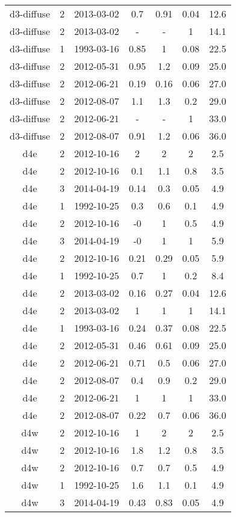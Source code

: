\begin{table*}[htp]
\begin{tabular}{ccccccc}
d3-diffuse & 2 & 2013-03-02 & 0.7 & 0.91 & 0.04 & 12.6 \\
d3-diffuse & 2 & 2013-03-02 & - & - & 1 & 14.1 \\
d3-diffuse & 1 & 1993-03-16 & 0.85 & 1 & 0.08 & 22.5 \\
d3-diffuse & 2 & 2012-05-31 & 0.95 & 1.2 & 0.09 & 25.0 \\
d3-diffuse & 2 & 2012-06-21 & 0.19 & 0.16 & 0.06 & 27.0 \\
d3-diffuse & 2 & 2012-08-07 & 1.1 & 1.3 & 0.2 & 29.0 \\
d3-diffuse & 2 & 2012-06-21 & - & - & 1 & 33.0 \\
d3-diffuse & 2 & 2012-08-07 & 0.91 & 1.2 & 0.06 & 36.0 \\
d4e & 2 & 2012-10-16 & 2 & 2 & 2 & 2.5 \\
d4e & 2 & 2012-10-16 & 0.1 & 1.1 & 0.8 & 3.5 \\
d4e & 3 & 2014-04-19 & 0.14 & 0.3 & 0.05 & 4.9 \\
d4e & 1 & 1992-10-25 & 0.3 & 0.6 & 0.1 & 4.9 \\
d4e & 2 & 2012-10-16 & -0 & 1 & 0.5 & 4.9 \\
d4e & 3 & 2014-04-19 & -0 & 1 & 1 & 5.9 \\
d4e & 2 & 2012-10-16 & 0.21 & 0.29 & 0.05 & 5.9 \\
d4e & 1 & 1992-10-25 & 0.7 & 1 & 0.2 & 8.4 \\
d4e & 2 & 2013-03-02 & 0.16 & 0.27 & 0.04 & 12.6 \\
d4e & 2 & 2013-03-02 & 1 & 1 & 1 & 14.1 \\
d4e & 1 & 1993-03-16 & 0.24 & 0.37 & 0.08 & 22.5 \\
d4e & 2 & 2012-05-31 & 0.46 & 0.61 & 0.09 & 25.0 \\
d4e & 2 & 2012-06-21 & 0.71 & 0.5 & 0.06 & 27.0 \\
d4e & 2 & 2012-08-07 & 0.4 & 0.9 & 0.2 & 29.0 \\
d4e & 2 & 2012-06-21 & 1 & 1 & 1 & 33.0 \\
d4e & 2 & 2012-08-07 & 0.22 & 0.7 & 0.06 & 36.0 \\
d4w & 2 & 2012-10-16 & 1 & 2 & 2 & 2.5 \\
d4w & 2 & 2012-10-16 & 1.8 & 1.2 & 0.8 & 3.5 \\
d4w & 2 & 2012-10-16 & 0.7 & 0.7 & 0.5 & 4.9 \\
d4w & 1 & 1992-10-25 & 1.6 & 1.1 & 0.1 & 4.9 \\
d4w & 3 & 2014-04-19 & 0.43 & 0.83 & 0.05 & 4.9 \\

\end{tabular}
\end{table*}
